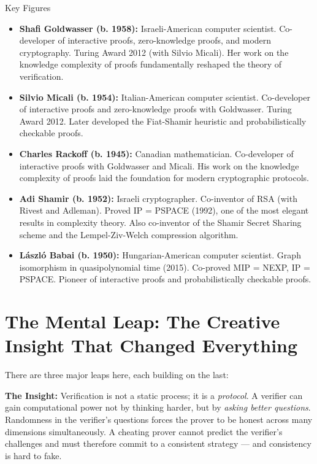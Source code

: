 \begin{subsection}{Key Figures}
\begin{itemize}
\item \textbf{Shafi Goldwasser (b. 1958):} Israeli-American computer scientist. Co-developer of interactive proofs, zero-knowledge proofs, and modern cryptography. Turing Award 2012 (with Silvio Micali). Her work on the knowledge complexity of proofs fundamentally reshaped the theory of verification.

\item \textbf{Silvio Micali (b. 1954):} Italian-American computer scientist. Co-developer of interactive proofs and zero-knowledge proofs with Goldwasser. Turing Award 2012. Later developed the Fiat-Shamir heuristic and probabilistically checkable proofs.

\item \textbf{Charles Rackoff (b. 1945):} Canadian mathematician. Co-developer of interactive proofs with Goldwasser and Micali. His work on the knowledge complexity of proofs laid the foundation for modern cryptographic protocols.

\item \textbf{Adi Shamir (b. 1952):} Israeli cryptographer. Co-inventor of RSA (with Rivest and Adleman). Proved IP = PSPACE (1992), one of the most elegant results in complexity theory. Also co-inventor of the Shamir Secret Sharing scheme and the Lempel-Ziv-Welch compression algorithm.

\item \textbf{László Babai (b. 1950):} Hungarian-American computer scientist. Graph isomorphism in quasipolynomial time (2015). Co-proved MIP = NEXP, IP = PSPACE. Pioneer of interactive proofs and probabilistically checkable proofs.
\end{itemize}
\end{subsection}

\section{The Mental Leap: The Creative Insight That Changed Everything}
\label{sec:ip:leap}

There are three major leaps here, each building on the last:

\textbf{The Insight:} Verification is not a static process; it is a \emph{protocol}. A verifier can gain computational power not by thinking harder, but by \emph{asking better questions}. Randomness in the verifier's questions forces the prover to be honest across many dimensions simultaneously. A cheating prover cannot predict the verifier's challenges and must therefore commit to a consistent strategy --- and consistency is hard to fake.

